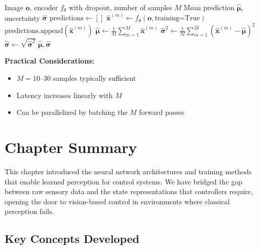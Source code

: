 \begin{algorithm}[H]
\caption{Monte Carlo Dropout Inference}
\label{alg:mc_dropout}
\begin{algorithmic}[1]
\REQUIRE Image $\mathbf{o}$, encoder $f_\theta$ with dropout, number of samples $M$
\ENSURE Mean prediction $\hat{\boldsymbol{\mu}}$, uncertainty $\hat{\boldsymbol{\sigma}}$
\STATE $\text{predictions} \gets []$
\STATE
{}
    \STATE {}
    \STATE $\hat{\mathbf{x}}^{(m)} \gets f_\theta(\mathbf{o}, \text{training=True})$ 
    \STATE $\text{predictions}.\text{append}(\hat{\mathbf{x}}^{(m)})$
\ENDFOR
\STATE
\STATE {}
\STATE $\hat{\boldsymbol{\mu}} \gets \frac{1}{M} \sum_{m=1}^M \hat{\mathbf{x}}^{(m)}$
\STATE $\hat{\boldsymbol{\sigma}}^2 \gets \frac{1}{M} \sum_{m=1}^M (\hat{\mathbf{x}}^{(m)} - \hat{\boldsymbol{\mu}})^2$
\STATE $\hat{\boldsymbol{\sigma}} \gets \sqrt{\hat{\boldsymbol{\sigma}}^2}$
\RETURN $\hat{\boldsymbol{\mu}}, \hat{\boldsymbol{\sigma}}$
\end{algorithmic}
\end{algorithm}

\textbf{Practical Considerations:}
\begin{itemize}
    \item $M = 10$--$30$ samples typically sufficient
    \item Latency increases linearly with $M$
    \item Can be parallelized by batching the $M$ forward passes
\end{itemize}

\section{Chapter Summary}
\label{sec:chapter_summary}

This chapter introduced the neural network architectures and training methods that enable learned perception for control systems. We have bridged the gap between raw sensory data and the state representations that controllers require, opening the door to vision-based control in environments where classical perception fails.

\subsection{Key Concepts Developed}

